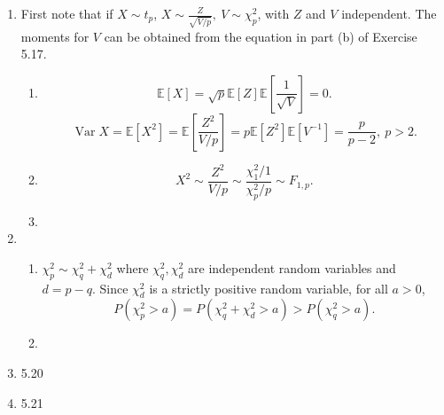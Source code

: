 \documentclass{article}
\DeclareMathOperator{\var}{Var}
\begin{document}
\begin{enumerate}
\begin{enumerate}
        \item 
    \end{enumerate}
    
    \item First note that if $X \sim t_p$, $X \sim \frac{Z}{\sqrt{V / p}}, \ V \sim \chi_p^2$, with $Z$ and 
    $V$ independent. The moments for $V$ can be obtained from the equation in part (b) of Exercise 5.17.
    \begin{enumerate}
        \item \[ \mathbb{E}[X] = \sqrt{p}\mathbb{E}[Z]\mathbb{E}[\frac{1}{\sqrt{V}}] = 0. \]
        \[ \var{X} = \mathbb{E}[X^2] = \mathbb{E}[\frac{Z^2}{V / p}] 
        = p \mathbb{E}[Z^2]\mathbb{E}[V^{-1}] = \frac{p}{p - 2}, \ p > 2. \]

        \item \[ X^2 \sim \frac{Z^2}{V / p} \sim \frac{\chi_1^2 / 1}{\chi_p^2 / p} \sim F_{1, p}. \]

        \item 
    \end{enumerate}
    
    \item \begin{enumerate}
        \item $\chi_p^2 \sim \chi_q^2 + \chi_d^2$ where $\chi_q^2, \chi_d^2$ are independent random 
        variables and $d = p - q$. Since $\chi_d^2$ is a strictly positive random variable, for all $a > 0$, 
        \[ P(\chi_p^2 > a) = P(\chi_q^2 + \chi_d^2 > a) > P(\chi_q^2 > a). \]

        \item 
    \end{enumerate}
    
    \item 5.20
    
    \item 5.21
    
    
\end{enumerate}
\end{document}
